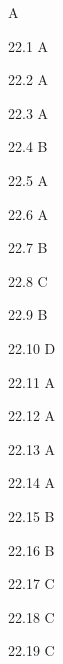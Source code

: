 \begin{Solution}{22}
A
\end{Solution}
\begin{Solution}{22.{1}}
A
\end{Solution}
\begin{Solution}{22.{2}}
A
\end{Solution}
\begin{Solution}{22.{3}}
A
\end{Solution}
\begin{Solution}{22.{4}}
B
\end{Solution}
\begin{Solution}{22.{5}}
A
\end{Solution}
\begin{Solution}{22.{6}}
A
\end{Solution}
\begin{Solution}{22.{7}}
B
\end{Solution}
\begin{Solution}{22.{8}}
C
\end{Solution}
\begin{Solution}{22.{9}}
B
\end{Solution}
\begin{Solution}{22.{10}}
D
\end{Solution}
\begin{Solution}{22.{11}}
A
\end{Solution}
\begin{Solution}{22.{12}}
A
\end{Solution}
\begin{Solution}{22.{13}}
A
\end{Solution}
\begin{Solution}{22.{14}}
A
\end{Solution}
\begin{Solution}{22.{15}}
B
\end{Solution}
\begin{Solution}{22.{16}}
B
\end{Solution}
\begin{Solution}{22.{17}}
C
\end{Solution}
\begin{Solution}{22.{18}}
C
\end{Solution}
\begin{Solution}{22.{19}}
C
\end{Solution}
